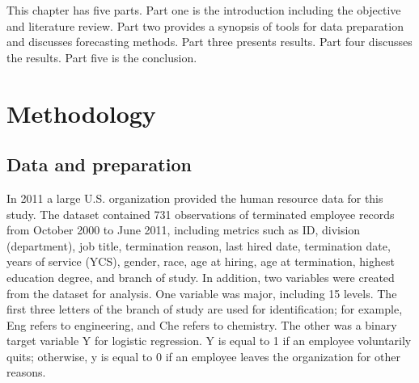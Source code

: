 This chapter has five parts. Part one is the introduction including the objective and literature review. Part two provides a synopsis of tools for data preparation and discusses forecasting methods. Part three presents results. Part four discusses the results. Part five is the conclusion. 
\section{Methodology}
\subsection{Data and preparation}
In 2011 a large U.S. organization provided the human resource data for this study. The dataset contained 731 observations of terminated employee records from October 2000 to June 2011, including metrics such as ID, division (department), job title, termination reason, last hired date, termination date, years of service (YCS), gender, race, age at hiring, age at termination, highest education degree, and branch of study. 
In addition, two variables were created from the dataset for analysis. One variable was major, including 15 levels. The first three letters of the branch of study are used for identification; for example, Eng refers to engineering, and Che refers to chemistry. The other was a binary target variable Y for logistic regression. Y is equal to 1 if an employee voluntarily quits; otherwise, y is equal to 0 if an employee leaves the organization for other reasons.
